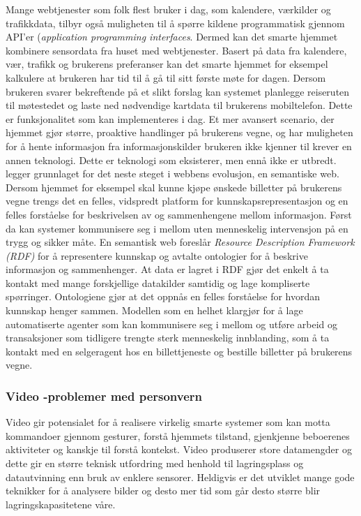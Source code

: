 {Mange webtjenester som folk flest bruker i dag, som kalendere, værkilder og trafikkdata, tilbyr også muligheten til å spørre kildene programmatisk gjennom API'er (\emph{application programming interfaces}. Dermed kan det smarte hjemmet kombinere sensordata fra huset med webtjenester. Basert på data fra kalendere, vær, trafikk og brukerens preferanser kan det smarte hjemmet for eksempel kalkulere at brukeren har tid til å gå til sitt første møte for dagen. Dersom brukeren svarer bekreftende på et slikt forslag kan systemet planlegge reiseruten til møtestedet og laste ned nødvendige kartdata til brukerens mobiltelefon. Dette er funksjonalitet som kan implementeres i dag. Et mer avansert scenario, der hjemmet gjør større, proaktive handlinger på brukerens vegne, og har muligheten for å hente informasjon fra informasjonskilder brukeren ikke kjenner til krever en annen teknologi. Dette er teknologi som eksisterer, men ennå ikke er utbredt. \citet{semantic01} legger grunnlaget for det neste steget i webbens evolusjon, en semantiske web. Dersom hjemmet for eksempel skal kunne kjøpe ønskede billetter på brukerens vegne trengs det en felles, vidspredt platform for kunnskapsrepresentasjon og en felles forståelse for beskrivelsen av og sammenhengene mellom informasjon. Først da kan systemer kommunisere seg i mellom uten menneskelig intervensjon på en trygg og sikker måte. En semantisk web foreslår \emph{Resource Description Framework (RDF)} for å representere kunnskap og avtalte ontologier for å beskrive informasjon og sammenhenger. At data er lagret i RDF gjør det enkelt å ta kontakt med mange forskjellige datakilder samtidig og lage kompliserte spørringer. Ontologiene gjør at det oppnås en felles forståelse for hvordan kunnskap henger sammen. Modellen som en helhet klargjør for å lage automatiserte agenter som kan kommunisere seg i mellom og utføre arbeid og transaksjoner som tidligere trengte sterk menneskelig innblanding, som å ta kontakt med en selgeragent hos en billettjeneste og bestille billetter på brukerens vegne.

\subsubsection*{Video -problemer med personvern}
Video gir potensialet for å realisere virkelig smarte systemer som kan motta kommandoer gjennom gesturer, forstå hjemmets tilstand, gjenkjenne beboerenes aktiviteter og kanskje til forstå kontekst. Video produserer store datamengder og dette gir en større teknisk utfordring med henhold til lagringsplass og datautvinning enn bruk av enklere sensorer. Heldigvis er det utviklet mange gode teknikker for å analysere bilder og desto mer tid som går desto større blir lagringskapasitetene våre.

}
